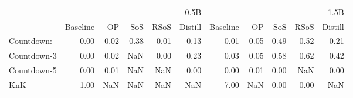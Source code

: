 \begin{tabular}{lrrrrrrrrrr}
\toprule
 & \multicolumn{5}{r}{0.5B} & \multicolumn{5}{r}{1.5B} \\
 & Baseline & OP & SoS & RSoS & Distill & Baseline & OP & SoS & RSoS & Distill \\
\midrule
Countdown: & 0.00 & 0.02 & 0.38 & 0.01 & 0.13 & 0.01 & 0.05 & 0.49 & 0.52 & 0.21 \\
Countdown-3 & 0.00 & 0.02 & NaN & 0.00 & 0.23 & 0.03 & 0.05 & 0.58 & 0.62 & 0.42 \\
Countdown-5 & 0.00 & 0.01 & NaN & NaN & 0.00 & 0.00 & 0.01 & 0.00 & NaN & 0.00 \\
KnK & 1.00 & NaN & NaN & NaN & NaN & 7.00 & NaN & 0.00 & 0.00 & NaN \\
\bottomrule
\end{tabular}
